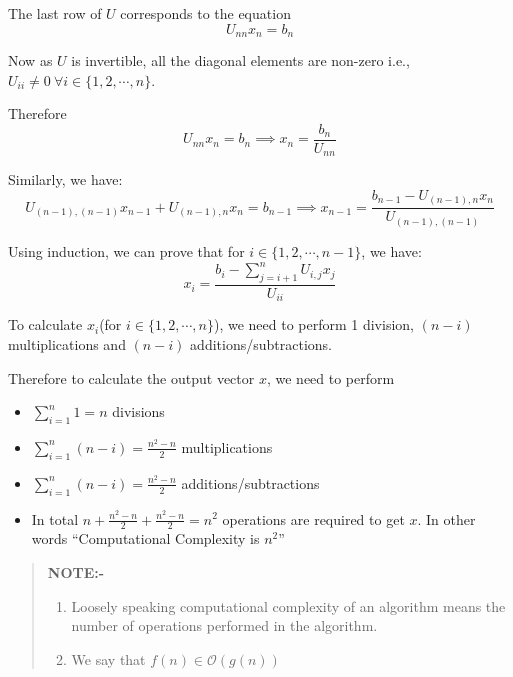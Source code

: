 \documentclass[
]{book}
\begin{document}
The last row of \(U\) corresponds to the equation
\begin{equation}
U_{nn} x_n = b_n
\end{equation}

Now as \(U\) is invertible, all the diagonal elements are non-zero i.e., \(U_{ii}\neq 0 \ \forall i \in\{1,2,\cdots , n\}\).

Therefore
\begin{equation}
U_{nn} x_n = b_n \implies x_n = \frac{b_n}{U_{nn}}
\end{equation}

Similarly, we have:
\begin{equation}
U_{(n-1),(n-1)}x_{n-1}+U_{(n-1),n}x_n = b_{n-1} \implies x_{n-1} = \frac{b_{n-1}-U_{(n-1),n}x_n}{U_{(n-1),(n-1)}}
\end{equation}

Using induction, we can prove that for \(i \in \{1,2,\cdots,n-1\}\), we have:
\begin{equation}
x_i = \frac{b_i -\sum_{j=i+1}^n U_{i,j}x_j}{U_{ii}}
\end{equation}

To calculate \(x_i\)(for \(i \in \{1,2,\cdots,n\}\)), we need to perform 1 division, \((n-i)\) multiplications and \((n-i)\) additions/subtractions.

Therefore to calculate the output vector \(x\), we need to perform

\begin{itemize}
\item
  \(\sum_{i=1}^n 1 = n\) divisions
\item
  \(\sum_{i=1}^n (n-i) = \frac{n^2-n}{2}\) multiplications
\item
  \(\sum_{i=1}^n (n-i) = \frac{n^2-n}{2}\) additions/subtractions
\item
  In total \(n+ \frac{n^2-n}{2}+\frac{n^2-n}{2} = n^2\) operations are required to get \(x\). In other words ``Computational Complexity is \(n^2\)''
\end{itemize}

\begin{quote}
\textbf{NOTE:- }

\begin{enumerate}
\def\labelenumi{\arabic{enumi}.}
\item
  Loosely speaking computational complexity of an algorithm means the number of operations performed in the algorithm.
\item
  We say that \(f(n)\in \mathcal{O}(g(n))\)
\end{enumerate}
\end{quote}
\end{document}
